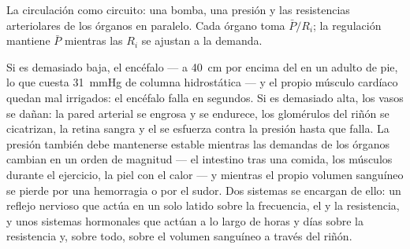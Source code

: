 \begin{omfigure}

{\small La circulación como circuito: una bomba, una presión y las
resistencias arteriolares de los órganos en paralelo. Cada órgano toma
$\bar P/R_i$; la regulación mantiene $\bar P$ mientras las $R_i$ se
ajustan a la demanda.}
\end{omfigure}

\begin{proposition}\label{prop:b2:blood-pressure:why}
Si es demasiado baja, el encéfalo --- a \qty{40}{cm} por encima del  en
un adulto de pie, lo que cuesta \qty{31}{mmHg} de columna hidrostática ---
y el propio músculo cardíaco quedan mal irrigados: el encéfalo falla en
segundos. Si es demasiado alta, los vasos se dañan: la pared arterial se
engrosa y se endurece, los glomérulos del riñón se cicatrizan, la retina
sangra y el  se esfuerza contra la presión hasta que falla. La
presión también debe mantenerse estable mientras las demandas de los
órganos cambian en un orden de magnitud --- el intestino tras una comida,
los músculos durante el ejercicio, la piel con el calor --- y mientras el
propio volumen sanguíneo se pierde por una hemorragia o por el sudor. Dos
sistemas se encargan de ello: un reflejo nervioso que actúa en un solo
latido sobre la frecuencia, el  y la resistencia, y unos
sistemas hormonales que actúan a lo largo de horas y días sobre la
resistencia y, sobre todo, sobre el volumen sanguíneo a través del riñón.
\end{proposition}

